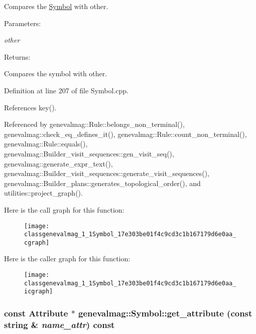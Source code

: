 Compares the \hyperlink{classgenevalmag_1_1Symbol}{Symbol} with other. \begin{Desc}
\item[Parameters:]
\begin{description}
\item[{\em other}]\end{description}
\end{Desc}
\begin{Desc}
\item[Returns:]\end{Desc}
Compares the symbol with other. 

Definition at line 207 of file Symbol.cpp.

References key().

Referenced by genevalmag::Rule::belongs\_\-non\_\-terminal(), genevalmag::check\_\-eq\_\-defines\_\-it(), genevalmag::Rule::count\_\-non\_\-terminal(), genevalmag::Rule::equals(), genevalmag::Builder\_\-visit\_\-sequences::gen\_\-visit\_\-seq(), genevalmag::generate\_\-expr\_\-text(), genevalmag::Builder\_\-visit\_\-sequences::generate\_\-visit\_\-sequences(), genevalmag::Builder\_\-plans::generates\_\-topological\_\-order(), and utilities::project\_\-graph().

Here is the call graph for this function:\nopagebreak
\begin{figure}[H]
\begin{center}
\leavevmode
\texttt{[image: classgenevalmag\_1\_1Symbol\_17e303be01f4c9cd3c1b167179d6e0aa\_cgraph]}
\end{center}
\end{figure}


Here is the caller graph for this function:\nopagebreak
\begin{figure}[H]
\begin{center}
\leavevmode
\texttt{[image: classgenevalmag\_1\_1Symbol\_17e303be01f4c9cd3c1b167179d6e0aa\_icgraph]}
\end{center}
\end{figure}
\hypertarget{classgenevalmag_1_1Symbol_58f45135b17a802eb9e124d91875204b}{
\subsubsection[{get\_\-attribute}]{\setlength{\rightskip}{0pt plus 5cm}const {\bf Attribute} $\ast$ genevalmag::Symbol::get\_\-attribute (const string \& {\em name\_\-attr}) const}}
\label{classgenevalmag_1_1Symbol_58f45135b17a802eb9e124d91875204b}


